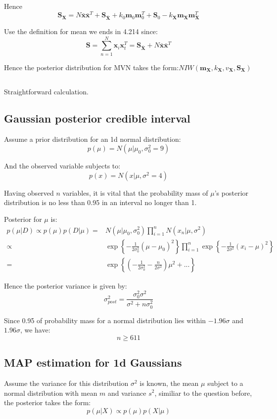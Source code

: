 \documentclass[UTF8]{ctexart}
\begin{document}
Hence
$$\textbf{S}_{\textbf{X}} = N \bar{\textbf{x}} \bar{\textbf{x}}^{T} + \textbf{S}_{\bar{\textbf{X}}} + k_{0}\textbf{m}_{0}\textbf{m}_{0}^{T} + \textbf{S}_{0} - k_{\textbf{X}}\textbf{m}_{\textbf{X}}\textbf{m}_{\textbf{X}}^{T} $$

Use the definition for mean we ends in 4.214 since:
$$\textbf{S}=\sum_{n=1}^{N}\textbf{x}_{i}\textbf{x}_{t}^{T} = \textbf{S}_{\bar{\textbf{X}}} + N \bar{\textbf{x}}\bar{\textbf{x}}^{T}$$

Hence the posterior distribution for MVN takes the form:$NIW(\textbf{m}_{\textbf{X}},k_{\textbf{X}},v_{\textbf{X}},\textbf{S}_{\textbf{X}})$

\subsection{}
Straightforward calculation.


\subsection{Gaussian posterior credible interval}
Assume a prior distribution for an 1d normal distribution:
$$p(\mu) = N(\mu|\mu_{0},\sigma^{2}_{0} = 9)$$

And the observed variable subjects to:
$$p(x) = N(x|\mu,\sigma^{2}=4)$$

Having observed $n$ variables, it is vital that the probability mass of $\mu$'s posterior distribution is no less than 0.95 in an interval no longer than 1.

Posterior for $\mu$ is:
\begin{align}
p(\mu|D) \propto p(\mu)p(D|\mu) =& N(\mu|\mu_{0},\sigma^{2}_{0})\prod_{i=1}^{n}N(x_{n}|\mu,\sigma^{2})\nonumber \\
\propto& \exp\left\{-\frac{1}{2\sigma^{2}_{0}}(\mu-\mu_{0})^{2}  \right\} \prod_{i=1}^{n}\exp\left\{  -\frac{1}{2\sigma^{2}}(x_{i}-\mu)^{2}\right\}\nonumber \\
=&\exp\left\{ (-\frac{1}{2\sigma_{0}^{2}}-\frac{n}{2\sigma^{2}})\mu^{2} + ... \right\}\nonumber 
\end{align}

Hence the posterior variance is given by:
$$\sigma^{2}_{post}=\frac{\sigma^{2}_{0}\sigma^{2}}{\sigma^{2}+n\sigma^{2}_{0}}$$

Since 0.95 of probability mass for a normal distribution lies within $-1.96\sigma$ and $1.96\sigma$, we have:
$$n \geq 611$$

\subsection{MAP estimation for 1d Gaussians}
Assume the variance for this distribution $\sigma^{2}$ is known, the mean $\mu$ subject to a normal distribution with mean $m$ and variance $s^{2}$, similiar to the question before, the posterior takes the form:
$$p(\mu|X) \propto p(\mu)p(X|\mu)$$
\end{document}
